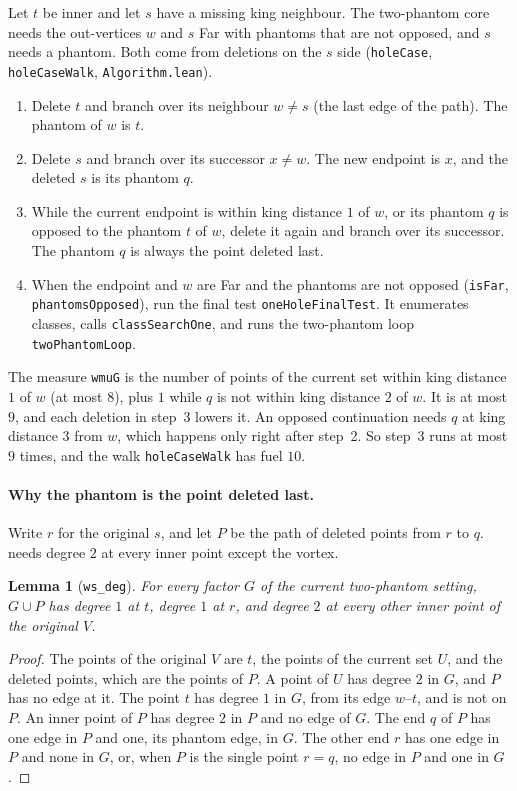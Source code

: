 \documentclass[11pt]{article}
\theoremstyle{plain}
\newtheorem{lemma}[theorem]{Lemma}
\theoremstyle{definition}
\theoremstyle{remark}
\newcommand{\lean}[1]{\texttt{#1}}
\begin{document}
Let $t$ be inner and let $s$ have a missing king neighbour.
The two-phantom core needs the out-vertices $w$ and $s$ Far with phantoms that are not opposed,
and $s$ needs a phantom.
Both come from deletions on the $s$ side (\lean{holeCase}, \lean{holeCaseWalk}, \lean{Algorithm.lean}).
\begin{enumerate}
\item Delete $t$ and branch over its neighbour $w\ne s$ (the last edge of the path).
  The phantom of $w$ is $t$.
\item Delete $s$ and branch over its successor $x\ne w$.
  The new endpoint is $x$, and the deleted $s$ is its phantom $q$.
\item While the current endpoint is within king distance $1$ of $w$, or its phantom $q$ is opposed to
  the phantom $t$ of $w$, delete it again and branch over its successor.
  The phantom $q$ is always the point deleted last.
\item When the endpoint and $w$ are Far and the phantoms are not opposed (\lean{isFar},
  \lean{phantomsOpposed}), run the final test \lean{oneHoleFinalTest}.
  It enumerates classes, calls \lean{classSearchOne}, and runs the two-phantom loop \lean{twoPhantomLoop}.
\end{enumerate}
The measure \lean{wmuG} is the number of points of the current set within king distance $1$ of $w$
(at most $8$), plus $1$ while $q$ is not within king distance $2$ of $w$.
It is at most $9$, and each deletion in step~3 lowers it.
An opposed continuation needs $q$ at king distance $3$ from $w$, which happens only right after
step~2.
So step~3 runs at most $9$ times, and the walk \lean{holeCaseWalk} has fuel $10$.

\paragraph{Why the phantom is the point deleted last.}
Write $r$ for the original $s$, and let $P$ be the path of deleted points from $r$ to $q$.
 needs degree $2$ at every inner point except the vortex.

\begin{lemma}[\lean{ws\_deg}]
\label{lem:wsdeg}
For every factor $G$ of the current two-phantom setting, $G\cup P$ has degree $1$ at $t$, degree
$1$ at $r$, and degree $2$ at every other inner point of the original $V$.
\end{lemma}

\begin{proof}
The points of the original $V$ are $t$, the points of the current set $U$, and the deleted points,
which are the points of $P$.
A point of $U$ has degree $2$ in $G$, and $P$ has no edge at it.
The point $t$ has degree $1$ in $G$, from its edge $w$--$t$, and is not on $P$.
An inner point of $P$ has degree $2$ in $P$ and no edge of $G$.
The end $q$ of $P$ has one edge in $P$ and one, its phantom edge, in $G$.
The other end $r$ has one edge in $P$ and none in $G$, or, when $P$ is the single point $r=q$, no
edge in $P$ and one in $G$.
\end{proof}
\end{document}
